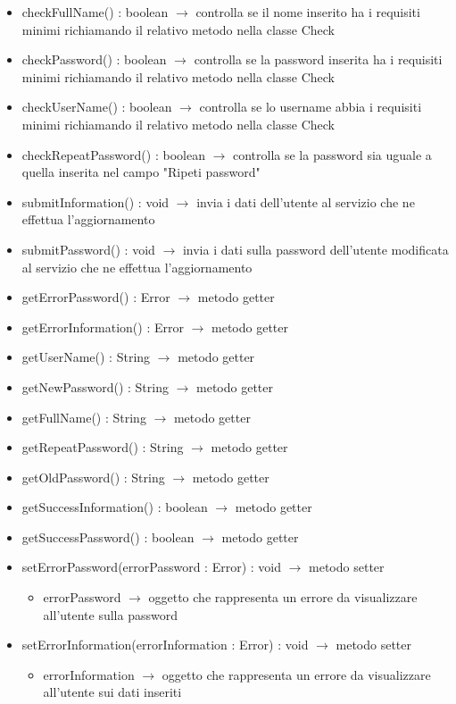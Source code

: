 \begin{description}
\begin{itemize}
	\item checkFullName() : boolean $\rightarrow$ controlla se il nome inserito ha i requisiti minimi richiamando il relativo metodo nella classe Check
	\item checkPassword() : boolean $\rightarrow$ controlla se la password inserita ha i requisiti minimi richiamando il relativo metodo nella classe Check
	\item checkUserName() : boolean $\rightarrow$ controlla se lo username abbia i requisiti minimi richiamando il relativo metodo nella classe Check
	\item checkRepeatPassword() : boolean $\rightarrow$ controlla se la password sia uguale a quella inserita nel campo "Ripeti password"
	\item submitInformation() : void $\rightarrow$ invia i dati dell'utente al servizio che ne effettua l'aggiornamento
	\item submitPassword() : void $\rightarrow$ invia i dati sulla password dell'utente modificata al servizio che ne effettua l'aggiornamento
	\item getErrorPassword() : Error $\rightarrow$ metodo getter
	\item getErrorInformation() : Error $\rightarrow$ metodo getter
	\item getUserName() : String $\rightarrow$ metodo getter
	\item getNewPassword() : String $\rightarrow$ metodo getter
	\item getFullName() : String $\rightarrow$ metodo getter
	\item getRepeatPassword() : String $\rightarrow$ metodo getter
	\item getOldPassword() : String $\rightarrow$ metodo getter
	\item getSuccessInformation() : boolean $\rightarrow$ metodo getter
	\item getSuccessPassword() : boolean $\rightarrow$ metodo getter
	\item setErrorPassword(errorPassword : Error) : void $\rightarrow$ metodo setter\begin{itemize}
		\item errorPassword $\rightarrow$ oggetto che rappresenta un errore da visualizzare all'utente sulla password
	\end{itemize}
	
	\item setErrorInformation(errorInformation : Error) : void $\rightarrow$ metodo setter\begin{itemize}
		\item errorInformation $\rightarrow$ oggetto che rappresenta un errore da visualizzare all'utente sui dati inseriti
	\end{itemize}
	

\end{itemize}
\end{description}
